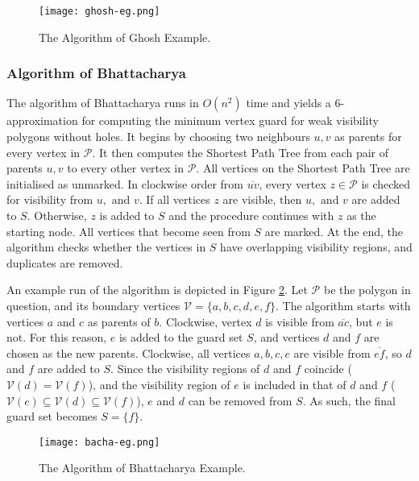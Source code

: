 \begin{figure}[h!]
    \centering
    \texttt{[image: ghosh-eg.png]}
    \caption{The Algorithm of Ghosh \cite{GHOSH2010718} Example.}
    \label{fig:ghosh}
\end{figure}

\newpage
\subsubsection{Algorithm of Bhattacharya \cite{bhattacharya2016approximability}}
The algorithm of Bhattacharya \cite{bhattacharya2016approximability} runs in $O(n^2)$ time and yields a 6-approximation for computing the minimum vertex guard for weak visibility polygons without holes. It begins by choosing two neighbours $u, v$ as parents for every vertex in $\mathcal P$. It then computes the Shortest Path Tree from each pair of parents $u, v$ to every other vertex in $\mathcal P$. All vertices on the Shortest Path Tree are initialised as unmarked. In clockwise order from $\overline{uv}$, every vertex $z \in \mathcal P$ is checked for visibility from $u, \text{ and } v$. If all vertices $z$ are visible, then $u, \text{ and }v$ are added to $S$. Otherwise, $z$ is added to $S$ and the procedure continues with $z$ as the starting node. All vertices that become seen from $S$ are marked. At the end, the algorithm checks whether the vertices in $S$ have overlapping visibility regions, and duplicates are removed.

An example run of the algorithm is depicted in Figure \ref{fig:bhaca}. Let $\mathcal P$ be the polygon in question, and its boundary vertices $\mathcal V = \{a, b, c, d, e, f\}$. The algorithm starts with vertices $a$ and $c$ as parents of $b$. Clockwise, vertex $d$ is visible from $\overline{ac}$, but $e$ is not. For this reason, $e$ is added to the guard set $S$, and vertices $d$ and $f$ are chosen as the new parents. Clockwise, all vertices $a, b, c, e$ are visible from $\overline{ef}$, so $d$ and $f$ are added to $S$. Since the visibility regions of $d$ and $f$ coincide ($\mathcal V(d) = \mathcal V(f)$), and the visibility region of $e$ is included in that of $d$ and $f$ ($\mathcal V(e) \subseteq \mathcal V(d) \subseteq \mathcal V(f)$), $e$ and $d$ can be removed from $S$. As such, the final guard set becomes $S = \{f\}$.

\begin{figure}[h!]
    \centering
    \texttt{[image: bacha-eg.png]}
    \caption{The Algorithm of Bhattacharya \cite{bhattacharya2016approximability} Example.}
    \label{fig:bhaca}
\end{figure}

